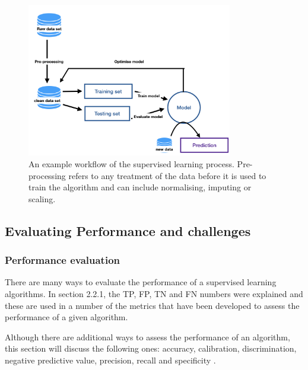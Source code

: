 \begin{figure}[H]
    \centering
    \includegraphics[width=0.8\textwidth]{ThesisTemplate/usingLatex/images/supervisedLearning.png}
    \caption{An example workflow of the supervised learning process. Pre-processing refers to any treatment of the data before it is used to train the algorithm and can include normalising, imputing or scaling.}
\end{figure}


\subsection{Evaluating Performance and challenges}

\subsubsection{Performance evaluation}
There are many ways to evaluate the performance of a supervised learning algorithms. In section 2.2.1, the TP, FP, TN and FN numbers were explained and these are used in a number of the metrics that have been developed to assess the performance of a given algorithm.

Although there are additional ways to assess the performance of an algorithm, this section will discuss the following ones: accuracy, calibration, discrimination, negative predictive value, precision, recall and specificity \citep{Callahan:2017bz}.

